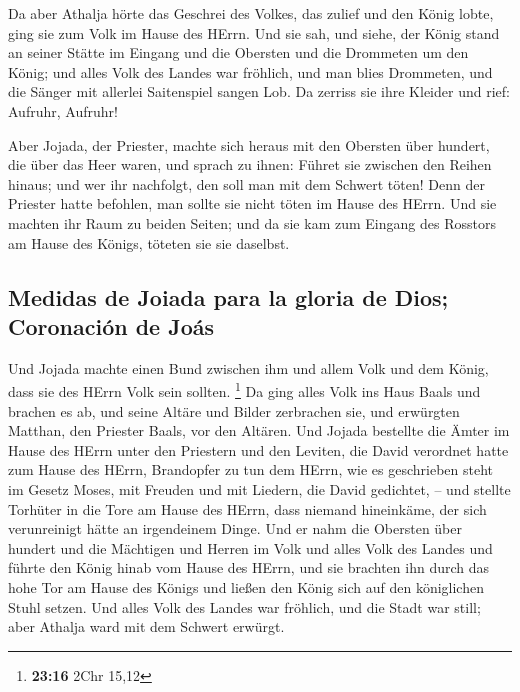  Da aber Athalja hörte das Geschrei des Volkes, das
zulief und den König lobte, ging sie zum Volk im Hause des HErrn.
 Und sie sah, und siehe, der König stand an seiner Stätte
im Eingang und die Obersten und die Drommeten um den König; und alles
Volk des Landes war fröhlich, und man blies Drommeten, und die Sänger
mit allerlei Saitenspiel sangen Lob. Da zerriss sie ihre Kleider und
rief: Aufruhr, Aufruhr!

 Aber Jojada, der Priester, machte sich heraus mit den
Obersten über hundert, die über das Heer waren, und sprach zu ihnen:
Führet sie zwischen den Reihen hinaus; und wer ihr nachfolgt, den soll
man mit dem Schwert töten! Denn der Priester hatte befohlen, man sollte
sie nicht töten im Hause des HErrn.  Und sie machten ihr
Raum zu beiden Seiten; und da sie kam zum Eingang des Rosstors am Hause
des Königs, töteten sie sie daselbst.

\hypertarget{medidas-de-joiada-para-la-gloria-de-dios-coronaciuxf3n-de-jouxe1s}{%
\subsection{Medidas de Joiada para la gloria de Dios; Coronación de
Joás}\label{medidas-de-joiada-para-la-gloria-de-dios-coronaciuxf3n-de-jouxe1s}}

 Und Jojada machte einen Bund zwischen ihm und allem Volk
und dem König, dass sie des HErrn Volk sein sollten. \footnote{\textbf{23:16}
  2Chr 15,12}  Da ging alles Volk ins Haus Baals und
brachen es ab, und seine Altäre und Bilder zerbrachen sie, und erwürgten
Matthan, den Priester Baals, vor den Altären.  Und Jojada
bestellte die Ämter im Hause des HErrn unter den Priestern und den
Leviten, die David verordnet hatte zum Hause des HErrn, Brandopfer zu
tun dem HErrn, wie es geschrieben steht im Gesetz Moses, mit Freuden und
mit Liedern, die David gedichtet, --  und stellte
Torhüter in die Tore am Hause des HErrn, dass niemand hineinkäme, der
sich verunreinigt hätte an irgendeinem Dinge.  Und er
nahm die Obersten über hundert und die Mächtigen und Herren im Volk und
alles Volk des Landes und führte den König hinab vom Hause des HErrn,
und sie brachten ihn durch das hohe Tor am Hause des Königs und ließen
den König sich auf den königlichen Stuhl setzen.  Und
alles Volk des Landes war fröhlich, und die Stadt war still; aber
Athalja ward mit dem Schwert erwürgt.

